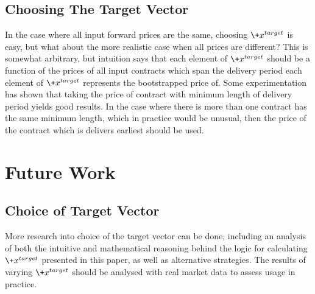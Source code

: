 \documentclass{article}
\begin{document}

\subsection{Choosing The Target Vector}
In the case where all input forward prices are the same, choosing $\+x^{target}$ is
easy, but what about the more realistic case when all prices are different? This is
somewhat arbitrary, but intuition says that each element of $\+x^{target}$ should be
a function of the prices of all input contracts which span the delivery period 
each element of $\+x^{target}$ represents the bootstrapped price of. Some experimentation
has shown that taking the price of contract with minimum length of delivery period yields
good results. In the case where there is more than one contract has the same minimum length,
which in practice would be unusual, then the price of the contract which is delivers earliest 
should be used.


\section{Future Work}
\subsection{Choice of Target Vector}
More research into choice of the target vector can be done, including an analysis of both
the intuitive and mathematical reasoning behind the logic for calculating $\+x^{target}$ 
presented in this paper, as well as alternative strategies. The results of varying  
$\+x^{target}$ should be analysed with real market data to assess usage in practice.

\bigskip
\end{document}
